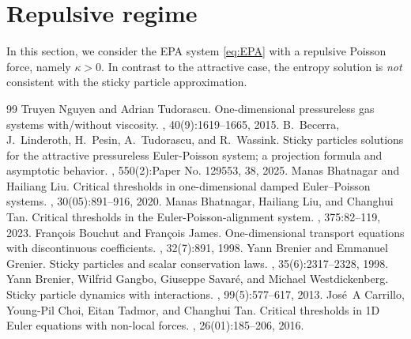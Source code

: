 \documentclass[10pt,a4paper]{amsart}
\begin{document}
	\section{Repulsive regime}\label{sec:repulsive}
	In this section, we consider the EPA system \eqref{eq:EPA} with a repulsive Poisson force, namely $\kappa>0$. In contrast to the attractive case, the entropy solution is \emph{not} consistent with the sticky particle approximation.
	

\begin{thebibliography}{99}
 Truyen Nguyen and Adrian Tudorascu. \newblock One-dimensional pressureless gas systems with/without viscosity. , 40(9):1619--1665, 2015.
 B.~Becerra, J.~Linderoth, H.~Pesin, A.~Tudorascu, and R.~Wassink. \newblock Sticky particles solutions for the attractive pressureless {E}uler-{P}oisson system; a projection formula and asymptotic behavior. , 550(2):Paper No. 129553, 38, 2025.
 Manas Bhatnagar and Hailiang Liu. \newblock Critical thresholds in one-dimensional damped {E}uler--{P}oisson systems. , 30(05):891--916, 2020.
 Manas Bhatnagar, Hailiang Liu, and Changhui Tan. \newblock Critical thresholds in the {E}uler-{P}oisson-alignment system. , 375:82--119, 2023.
 Fran{\c{c}}ois Bouchut and Fran{\c{c}}ois James. \newblock One-dimensional transport equations with discontinuous coefficients. , 32(7):891, 1998.
 Yann Brenier and Emmanuel Grenier. \newblock Sticky particles and scalar conservation laws. , 35(6):2317--2328, 1998.
 Yann Brenier, Wilfrid Gangbo, Giuseppe Savar{\'e}, and Michael Westdickenberg. \newblock Sticky particle dynamics with interactions. , 99(5):577--617, 2013.
 Jos{\'e}~A Carrillo, Young-Pil Choi, Eitan Tadmor, and Changhui Tan. \newblock Critical thresholds in {1D} {E}uler equations with non-local forces. , 26(01):185--206, 2016.

\end{thebibliography}
\end{document}
